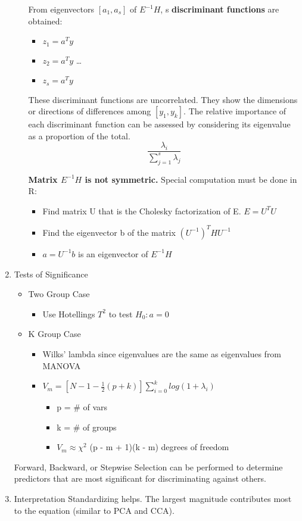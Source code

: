 \documentclass[11pt]{article}
\begin{document}
\begin{enumerate}
\begin{enumerate}
From eigenvectors \([a_1, a_s]\) of \(E^{-1}H\), s \textbf{discriminant functions}
are obtained:
\begin{itemize}
\item \(z_1 = a^Ty\)
\item \(z_2 = a^Ty\)
\ldots{}
\item \(z_s = a^Ty\)
\end{itemize}

These discriminant functions are uncorrelated. They show the dimensions
or directions of differences among \([y_1, y_k]\). The relative importance
of each discriminant function can be assessed by considering its
eigenvalue as a proportion of the total. $$
\frac{\lambda_i}{\sum_{j = 1}^s\lambda_j}
$$

\textbf{Matrix \(E^{-1}H\) is not symmetric.} Special computation must be done in
R:
\begin{itemize}
\item Find matrix U that is the Cholesky factorization of E. \(E = U^TU\)
\item Find the eigenvector b of the matrix \((U^{-1})^THU^{-1}\)
\item \(a = U^{-1}b\) is an eigenvector of \(E^{-1}H\)
\end{itemize}
\end{enumerate}

\item Tests of Significance
\label{sec:org0000c01}
\begin{itemize}
\item Two Group Case

\begin{itemize}
\item Use Hotellings \(T^2\) to test \(H_0: a = 0\)
\end{itemize}

\item K Group Case

\begin{itemize}
\item Wilks' lambda since eigenvalues are the same as eigenvalues from
MANOVA
\item \(V_m = [N - 1 - \frac{1}{2}(p + k)]\sum_{i = 0}^k log(1 + \lambda_i)\)

\begin{itemize}
\item p = \# of vars
\item k = \# of groups
\item \(V_m \approx \chi^2\) (p - m + 1)(k - m) degrees of freedom
\end{itemize}
\end{itemize}
\end{itemize}

Forward, Backward, or Stepwise Selection can be performed to determine
predictors that are most significant for discriminating against others.

\item Interpretation
\label{sec:org9d38876}
Standardizing helps. The largest magnitude contributes most to the
equation (similar to PCA and CCA).
\end{enumerate}
\end{document}
